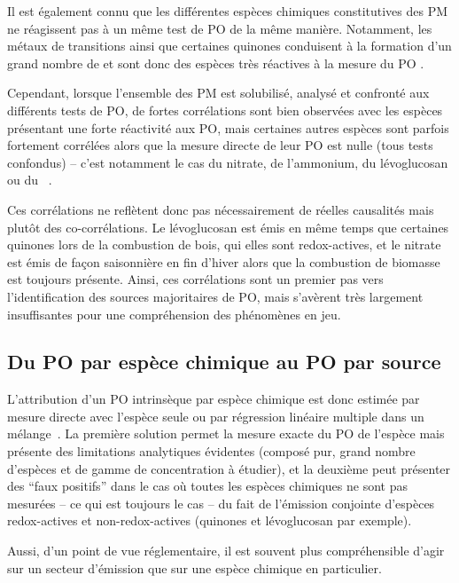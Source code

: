Il est également connu que les différentes espèces chimiques constitutives des PM ne
réagissent pas à un même test de PO de la même manière. Notamment, les métaux de
transitions ainsi que certaines quinones conduisent à la formation d'un grand nombre de
 et sont donc des espèces très réactives à la mesure du PO
\autocite{charrierRates2015,calasImportance2017}.

Cependant, lorsque l'ensemble des PM est solubilisé, analysé et confronté aux différents
tests de PO, de fortes corrélations sont bien observées avec les espèces présentant une
forte réactivité aux PO, mais certaines autres espèces sont parfois fortement corrélées
alors que la mesure directe de leur PO est nulle (tous tests confondus) -- c'est notamment
le cas du nitrate, de l'ammonium, du lévoglucosan ou du
~\autocite{vermaRedox2009,calasComparison2018,calasSeasonal2019}.

Ces corrélations ne reflètent donc pas nécessairement de réelles causalités mais plutôt des
co-corrélations. Le lévoglucosan est émis en même temps que certaines quinones lors de la
combustion de bois, qui elles sont redox-actives, et le nitrate est émis de façon
saisonnière en fin d'hiver alors que la combustion de biomasse est toujours présente.
Ainsi, ces corrélations sont un premier pas vers l'identification des sources majoritaires
de PO, mais s'avèrent très largement insuffisantes pour une compréhension des phénomènes
en jeu.

\subsection{Du PO par espèce chimique au PO par source}

L'attribution d'un PO intrinsèque par espèce chimique est donc estimée par mesure
directe avec l'espèce seule ou par régression linéaire
multiple dans un mélange~\autocite{calasImportance2017,borlazaOxidative2018}. La première solution permet
la mesure exacte du PO de l'espèce mais présente des limitations analytiques évidentes
(composé pur, grand nombre d'espèces et de gamme de concentration à étudier), et la
deuxième peut présenter des ``faux positifs'' dans le cas où toutes les espèces chimiques
ne sont pas mesurées -- ce qui est toujours le cas -- du fait de l'émission conjointe
d'espèces redox-actives et non-redox-actives (quinones et lévoglucosan par exemple).

Aussi, d'un point de vue réglementaire, il est souvent plus compréhensible d'agir sur
un secteur d'émission que sur une espèce chimique en particulier.

